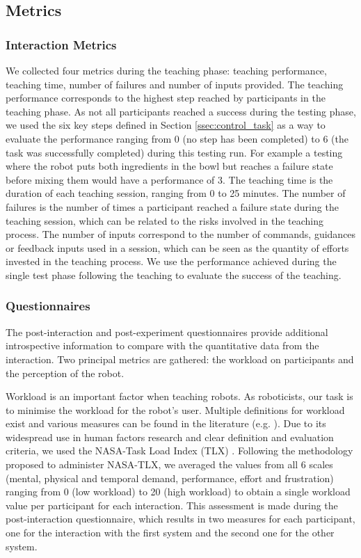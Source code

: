 \subsection{Metrics}

\subsubsection{Interaction Metrics}

We collected four metrics during the teaching phase: teaching performance, teaching time, number of failures and number of inputs provided. The teaching performance corresponds to the highest step reached by participants in the teaching phase. As not all participants reached a success during the testing phase, we used the six key steps defined in Section \ref{ssec:control_task} as a way to evaluate the performance ranging from 0 (no step has been completed) to 6 (the task was successfully completed) during this testing run. For example a testing where the robot puts both ingredients in the bowl but reaches a failure state before mixing them would have a performance of 3. The teaching time is the duration of each teaching session, ranging from 0 to 25 minutes. The number of failures is the number of times a participant reached a failure state during the teaching session, which can be related to the risks involved in the teaching process. The number of inputs correspond to the number of commands, guidances or feedback inputs used in a session, which can be seen as the quantity of efforts invested in the teaching process. We use the performance achieved during the single test phase following the teaching to evaluate the success of the teaching. 

\subsubsection{Questionnaires} \label{ssec:control_questionnaires}

The post-interaction and post-experiment questionnaires provide additional introspective information to compare with the quantitative data from the interaction. Two principal metrics are gathered: the workload on participants and the perception of the robot. 

Workload is an important factor when teaching robots. As roboticists, our task is to minimise the workload for the robot's user. Multiple definitions for workload exist and various measures can be found in the literature (e.g. \citealt{wierwille1983evaluation,moray2013mental}). Due to its widespread use in human factors research \citep{hart2006nasa} and clear definition and evaluation criteria, we used the NASA-Task Load Index (TLX) \citep{hart1988development}. Following the methodology proposed to administer NASA-TLX, we averaged the values from all 6 scales (mental, physical and temporal demand, performance, effort and frustration) ranging from 0 (low workload) to 20 (high workload) to obtain a single workload value per participant for each interaction. This assessment is made during the post-interaction questionnaire, which results in two measures for each participant, one for the interaction with the first system and the second one for the other system.

